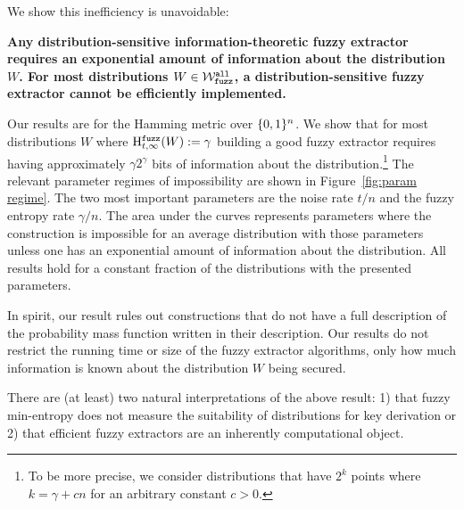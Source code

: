 We show this inefficiency is unavoidable:
\begin{displayquote}
\textbf{Any distribution-sensitive information-theoretic fuzzy extractor requires an exponential amount of information about the distribution $W$.  For most distributions $W \in \mathcal{W}_{\mathtt{fuzz}}^{\mathtt{all}}$, a distribution-sensitive fuzzy extractor cannot be efficiently implemented.} 
\end{displayquote} 
Our results are for the Hamming metric over $\{0, 1\}^n$. We show that for most distributions $W$ where $\mathrm{H}^{\mathtt{fuzz}}_{t,\infty}(W) := \gamma$ building a good fuzzy extractor requires having approximately $\gamma 2^\gamma$ bits of information about the distribution.\footnote{To be more precise,  we consider distributions that have $2^k$ points where $k = \gamma + c n$ for an arbitrary constant $c>0$.}
 The relevant parameter regimes of impossibility are shown in Figure~\ref{fig:param regime}.  The two most important parameters are the noise rate $t/n$ and the fuzzy entropy rate $\gamma/n$. The area under the curves represents parameters where the construction is impossible for an average distribution with those parameters unless one has an exponential amount of information about the distribution.  All results hold for a constant fraction of the distributions with the presented parameters.

In spirit, our result rules out constructions that do not have a full description of the probability mass function written in their description.  Our results do not restrict the running time or size of the fuzzy extractor algorithms, only how much information is known about the distribution $W$ being secured.  





There are (at least) two natural interpretations of the above result: 1) that fuzzy min-entropy does not measure the suitability of distributions for key derivation or 2) that efficient fuzzy extractors are an inherently computational object.

